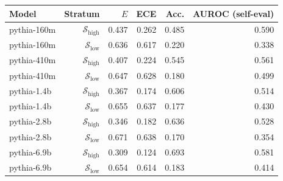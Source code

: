 \begin{tabular}{lrrrrr}
\toprule
Model & Stratum & $E$ & ECE & Acc. & AUROC (self-eval) \\
\midrule
pythia-160m & $\mathcal{S}_{\mathrm{high}}$ & 0.437 & 0.262 & 0.485 & 0.590 \\
pythia-160m & $\mathcal{S}_{\mathrm{low}}$ & 0.636 & 0.617 & 0.220 & 0.338 \\
pythia-410m & $\mathcal{S}_{\mathrm{high}}$ & 0.407 & 0.224 & 0.545 & 0.561 \\
pythia-410m & $\mathcal{S}_{\mathrm{low}}$ & 0.647 & 0.628 & 0.180 & 0.499 \\
pythia-1.4b & $\mathcal{S}_{\mathrm{high}}$ & 0.367 & 0.174 & 0.606 & 0.514 \\
pythia-1.4b & $\mathcal{S}_{\mathrm{low}}$ & 0.655 & 0.637 & 0.177 & 0.430 \\
pythia-2.8b & $\mathcal{S}_{\mathrm{high}}$ & 0.346 & 0.182 & 0.636 & 0.528 \\
pythia-2.8b & $\mathcal{S}_{\mathrm{low}}$ & 0.671 & 0.638 & 0.170 & 0.354 \\
pythia-6.9b & $\mathcal{S}_{\mathrm{high}}$ & 0.309 & 0.124 & 0.693 & 0.581 \\
pythia-6.9b & $\mathcal{S}_{\mathrm{low}}$ & 0.654 & 0.614 & 0.183 & 0.414 \\
\bottomrule
\end{tabular}
